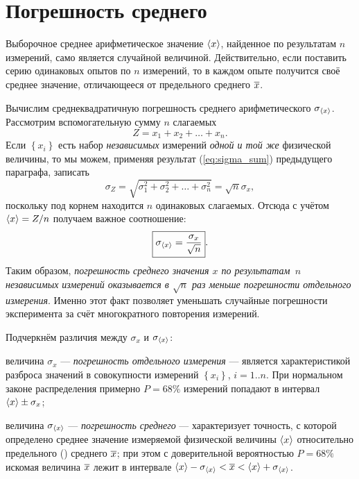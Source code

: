 \section{Погрешность среднего}\label{sec:average}

Выборочное среднее арифметическое значение $\left<x\right>$, найденное
по результатам $n$ измерений, само является случайной величиной.
Действительно, если поставить серию одинаковых опытов по $n$ измерений,
то в каждом опыте получится своё среднее значение, отличающееся от
предельного среднего $\overline{x}$.

Вычислим среднеквадратичную погрешность среднего арифметического
$\sigma_{\left<x\right>}$.
Рассмотрим вспомогательную сумму $n$ слагаемых
\[
    Z=x_{1}+x_{2}+\ldots+x_{n}.
\]
Если $\left\{ x_{i}\right\} $ есть набор \emph{независимых} измерений
\emph{одной и той же} физической величины, то мы можем, применяя результат
(\ref{eq:sigma_sum}) предыдущего параграфа, записать
\[
    \sigma_{Z}=\sqrt{\sigma_{1}^{2}+\sigma_{2}^{2}+\ldots+\sigma_{n}^{2}
    }=\sqrt{n}\sigma_{x},
\]
поскольку под корнем находится $n$ одинаковых слагаемых. Отсюда с
учётом $\left<x\right>=Z/n$ получаем важное соотношение:
\begin{equation}
\boxed{{\sigma_{\left<x\right>}=\frac{\sigma_{x}}{\sqrt{n}}}}.\label{eq:sigma_avg}
\end{equation}
Таким образом, \emph{погрешность среднего значения $x$ по результатам~$n$ независимых измерений оказывается в $\sqrt{n}$ раз меньше погрешности
отдельного измерения}. Именно этот факт позволяет
уменьшать случайные погрешности эксперимента за счёт многократного
повторения измерений.

Подчеркнём различия между $\sigma_{x}$ и $\sigma_{\left<x\right>}$:

величина $\sigma_{x}$ --- \emph{погрешность отдельного
измерения} --- является характеристикой разброса значений
в совокупности измерений $\left\{ x_{i}\right\} $, $i=1..n$. При
нормальном законе распределения примерно $P=68\%$ измерений попадают в
интервал $\left<x\right>\pm\sigma_{x}$;

величина $\sigma_{\left<x\right>}$ --- \emph{погрешность
среднего} --- характеризует точность, с которой определено
среднее значение измеряемой физической величины $\left<x\right>$ относительно
предельного () среднего $\overline{x}$;
при этом с доверительной вероятностью $P=68\%$ искомая величина $\overline{x}$
лежит в интервале
$\left<x\right>-\sigma_{\left<x\right>}<\overline{x}<\left<x\right>+\sigma_{\left<x\right>}$.


